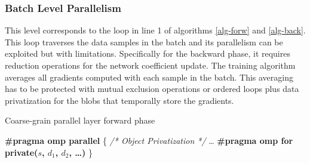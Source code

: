 \subsubsection{Batch Level Parallelism}
This level corresponds to the loop in line 1 of algorithms \ref{alg-forw}
and \ref{alg-back}. 
This loop traverses the data samples in the batch and its parallelism 
can be exploited but with limitations. 
Specifically for the backward phase, it requires reduction operations 
for the network coefficient update. The training algorithm averages all 
gradients computed with each sample in the batch. This averaging
has to be protected with mutual exclusion operations or ordered
loops plus data privatization for the blobs that temporally store the
gradients. 



\begin{algorithm}
\caption{Coarse-grain parallel layer forward phase}
\label{alg-par-forw}
\BlankLine
\textbf{\#pragma omp parallel}
\BlankLine
\{
\BlankLine
\emph{/* Object Privatization */}
\BlankLine
\dots
\BlankLine
\textbf{\#pragma omp for private($s$, $d_1$, $d_2$, \dots)}
\BlankLine
{}
\}
\end{algorithm}

